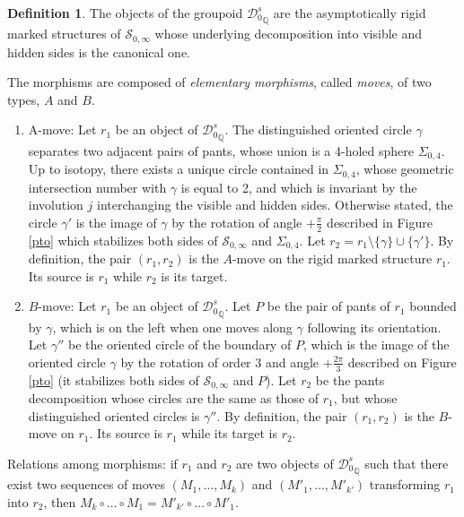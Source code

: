 \documentclass[twoside]{irmaems}
\theoremstyle{plain}
\theoremstyle{definition}
\newtheorem{definition}{Definition}[section]
\theoremstyle{remark}
\newcommand{\Q}{{\mathbb{Q}}}
\begin{document}
\begin{definition}
The objects of the groupoid ${{\mathscr{D}}_0^s}_{\Q}$ are 
the asymptotically rigid marked structures 
of $\mathscr{S}_{0,\infty}$
whose underlying decomposition into visible and hidden sides is the canonical one.

\vspace{0.1cm}\noindent 
The morphisms are composed of {\em elementary morphisms}, called {\em moves}, of two types, $A$ and $B$. 
\begin{enumerate}
\item A-move: Let $r_{1}$ be an object of ${{\mathscr{D}}_0^s}_{\Q}$. The distinguished oriented circle $\gamma$ 
separates two adjacent pairs of pants, whose union is a 4-holed sphere $\Sigma_{0,4}$. Up to isotopy, there exists a unique circle contained 
in $\Sigma_{0,4}$, whose geometric intersection number 
with $\gamma$ is equal to  2, and which is invariant by the involution $j$ interchanging the visible and hidden sides. 
Otherwise stated, the circle $\gamma'$ is the image of $\gamma$ by the rotation of angle
 $+\frac{\pi}{2}$ described in  Figure \ref{pto} which stabilizes both sides of $\mathscr{S}_{0,\infty}$ 
 and $\Sigma_{0,4}$.  
Let $r_{2}=r_{1}\setminus\{\gamma\}\cup \{\gamma'\}$. By definition, the pair $(r_{1},r_{2})$ is the $A$-move 
on the rigid marked structure $r_{1}$. Its source is $r_{1}$ while $r_{2}$ is its target.
\item $B$-move: Let $r_{1}$ be an object of ${{\mathscr{D}}_0^s}_{\Q}$. 
Let $P$ be the pair of pants of $r_{1}$  bounded by $\gamma$, which is on the left when one 
moves along $\gamma$ following its orientation. Let $\gamma''$ be the oriented circle of the boundary of $P$, which is 
the image of the oriented circle $\gamma$
by the rotation of order 3 and angle  $+\frac{2\pi}{3}$ described on  Figure \ref{pto} (it stabilizes both sides of
 $\mathscr{S}_{0,\infty}$ and $P$). Let  $r_{2}$ be the pants decomposition whose circles are the same as 
 those of $r_{1}$, but whose distinguished oriented circles is $\gamma''$. 
By definition, the pair $(r_{1},r_{2})$ is the $B$-move on $r_{1}$. Its source is $r_{1}$ while its target is $r_{2}$.


\end{enumerate}
 Relations among morphisms:  if $r_1$ and  $r_2$ are two objects of ${{\mathscr{D}}_0^s}_{\Q}$ such that there exist two 
 sequences of moves $(M_1,\ldots, M_k)$ and $(M'_1,\ldots, M'_{k'})$ transforming $r_1$ into $r_2$, 
 then  $M_k \circ \ldots \circ M_1= M'_{k'}\circ \ldots \circ M'_1$. 

\end{definition}
\end{document}

